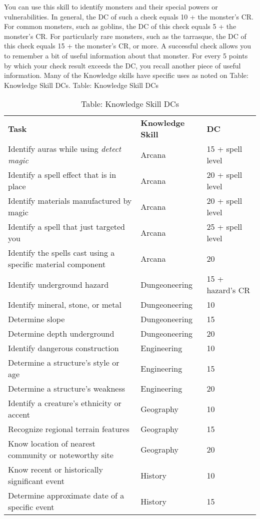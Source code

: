 You can use this skill to identify monsters and their special powers or vulnerabilities. In general, the DC of such a check equals 10 + the monster's CR. For common monsters, such as goblins, the DC of this check equals 5 + the monster's CR. For particularly rare monsters, such as the tarrasque, the DC of this check equals 15 + the monster's CR, or more. A successful check allows you to remember a bit of useful information about that monster. For every 5 points by which your check result exceeds the DC, you recall another piece of useful information. Many of the Knowledge skills have specific uses as noted on Table: Knowledge Skill DCs.
				Table: Knowledge Skill DCs
\begin{table}[]
\sffamily
\caption{Table: Knowledge Skill DCs}
\begin{tabular}{lll}
\textbf{Task} & \textbf{Knowledge Skill} & \textbf{DC}\\
Identify auras while using \textit{detect magic} & Arcana & 15 + spell level \\
Identify a spell effect that is in place & Arcana & 20 + spell level \\
Identify materials manufactured by magic & Arcana & 20 + spell level \\
Identify a spell that just targeted you &  Arcana & 25 + spell level \\ 
Identify the spells cast using a specific material component& Arcana& 20 \\ 
Identify underground hazard& Dungeoneering& 15 + hazard's CR \\
Identify mineral, stone, or metal& Dungeoneering& 10 \\
Determine slope& Dungeoneering& 15 \\
Determine depth underground& Dungeoneering& 20 \\
Identify dangerous construction& Engineering& 10 \\
Determine a structure's style or age& Engineering& 15 \\
Determine a structure's weakness& Engineering& 20 \\
Identify a creature's ethnicity or accent& Geography& 10 \\
Recognize regional terrain features& Geography& 15 \\
Know location of nearest community or noteworthy site& Geography& 20 \\
Know recent or historically significant event& History& 10 \\
Determine approximate date of a specific event& History& 15 \\

\end{tabular}
\end{table}
